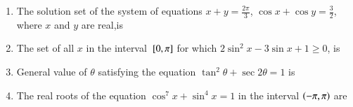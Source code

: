 \begin{enumerate}[label=\thesubsection.\arabic*,ref=\thesubsection.\theenumi]
%
    \item The solution set of the system of equations $x + y = \frac{2\pi}{3}$, $\cos x + \cos y = \frac{3}{2}$, where $x$ and $y$ are real,is 
        \hfill{}
    \item The set of all $x$ in the interval ${}\left[0,\pi\right]$ for which $2 \sin^2 x -3\sin x +1 \ge 0$, is 

        \hfill{}





    \item General value of $\theta$ satisfying the equation $\tan^{2}\theta +\sec2\theta = 1$ is 
        \hfill{}



    \item The real roots of the equation $\cos^{7}x + \sin^{4}x = 1$ in the interval $\left(-\pi,\pi\right)$ are 
        \hfill{}


\end{enumerate}
